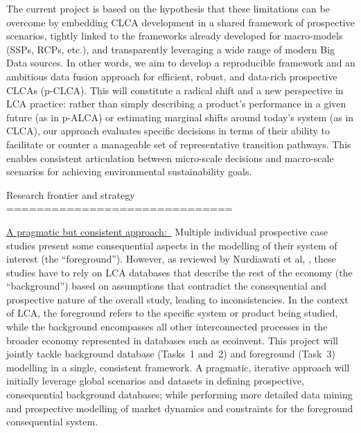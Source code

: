 \documentclass[compact]{nserc} %
\begin{document}
\begin{markdown}
The current project is based on the hypothesis that these limitations can be overcome by embedding CLCA development in a shared framework of prospective scenarios, tightly linked to the frameworks already developed for macro-models (SSPs, RCPs, etc.), and transparently leveraging a wide range of modern Big Data sources. In other words, we aim to develop a reproducible framework and an ambitious data fusion approach for efficient, robust, and data-rich prospective CLCAs (p-CLCA). This will constitute a radical shift and a new perspective in LCA practice: rather than simply describing a product’s performance in a given future (as in p-ALCA) or estimating marginal shifts around today’s system (as in CLCA), our approach evaluates specific decisions in terms of their ability to facilitate or counter a manageable set of representative transition pathways. This enables consistent articulation between micro-scale decisions and macro-scale scenarios for achieving environmental sustainability goals.


Research frontier and strategy
==============================



\underline{A pragmatic but consistent approach:~} Multiple individual prospective case studies present some consequential aspects in the modelling of their system of interest (the \enquote{foreground}). However, as reviewed by Nurdiawati et al, \cite{nurdiawatiRecentAdvancementsProspective2025}, these studies have to rely on LCA databases that describe the rest of the economy (the \enquote{background}) based on assumptions that contradict the consequential and prospective nature of the overall study, leading to inconsistencies. In the context of LCA, the foreground refers to the specific system or product being studied, while the background encompasses all other interconnected processes in the broader economy represented in databases such as ecoinvent. This project will jointly tackle background database (Tasks~1 and~2) and foreground (Task~3) modelling in a single, consistent framework. A pragmatic, iterative approach will initially leverage global scenarios and datasets in defining prospective, consequential background databases; while performing more detailed data mining and prospective modelling of market dynamics and constraints for the foreground consequential system.


\end{markdown}
\end{document}
